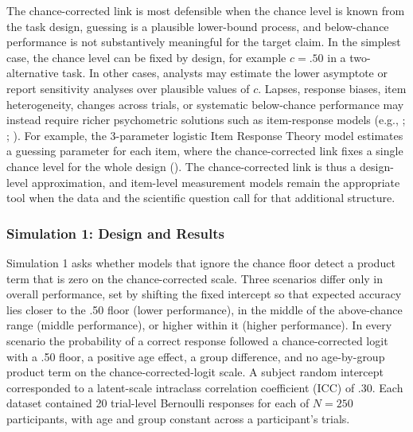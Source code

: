 \documentclass[
  man,
  floatsintext,
  longtable,
  nolmodern,
  notxfonts,
  notimes,
  colorlinks=true,linkcolor=blue,citecolor=blue,urlcolor=blue]{apa7}
\begin{document}
The chance-corrected link is most defensible when the chance level is
known from the task design, guessing is a plausible lower-bound process,
and below-chance performance is not substantively meaningful for the
target claim. In the simplest case, the chance level can be fixed by
design, for example \(c = .50\) in a two-alternative task. In other
cases, analysts may estimate the lower asymptote or report sensitivity
analyses over plausible values of \(c\). Lapses, response biases, item
heterogeneity, changes across trials, or systematic below-chance
performance may instead require richer psychometric solutions such as
item-response models (e.g., ; ; ). For
example, the 3-parameter logistic Item Response Theory model estimates a
guessing parameter for each item, where the chance-corrected link fixes
a single chance level for the whole design
(). The
chance-corrected link is thus a design-level approximation, and
item-level measurement models remain the appropriate tool when the data
and the scientific question call for that additional structure.

\subsubsection{Simulation 1: Design and
Results}\label{simulation-1-design-and-results}

Simulation 1 asks whether models that ignore the chance floor detect a
product term that is zero on the chance-corrected scale. Three scenarios
differ only in overall performance, set by shifting the fixed intercept
so that expected accuracy lies closer to the .50 floor (lower
performance), in the middle of the above-chance range (middle
performance), or higher within it (higher performance). In every
scenario the probability of a correct response followed a
chance-corrected logit with a .50 floor, a positive age effect, a group
difference, and no age-by-group product term on the
chance-corrected-logit scale. A subject random intercept corresponded to
a latent-scale intraclass correlation coefficient (ICC) of .30. Each
dataset contained 20 trial-level Bernoulli responses for each of
\(N = 250\) participants, with age and group constant across a
participant's trials.
\end{document}
